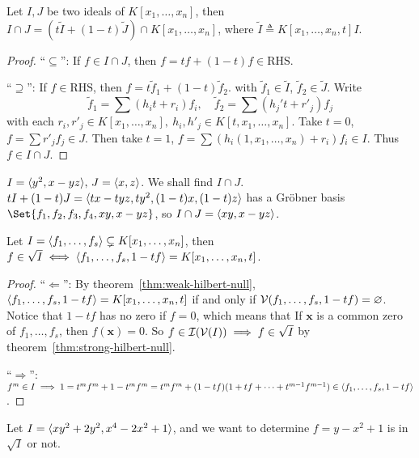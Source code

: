 \begin{theorem}
  Let $I, J$ be two ideals of $K[x_1, \dots, x_n]$, then $I \cap J =
  (t \tilde{I} + (1 - t) \tilde{J}) \cap K[x_1, \dots, x_n]$,
  where $\tilde{I} \triangleq K[x_1, \dots, x_n, t] I$.
  \begin{proof}
    ``$\subseteq$'': If $f \in I \cap J$, then $f = tf + (1-t)f \in \text{RHS}$.

    ``$\supseteq$'': If $f \in \text{RHS}$, then $f = t \tilde{f}_1 + (1-t) \tilde{f}_2$.
    with $\tilde{f}_1 \in \tilde{I}$, $\tilde{f}_2 \in \tilde{J}$.
    Write
    \[ \tilde{f}_1 = \sum (h_i t + r_i) f_i, \quad
      \tilde{f}_2 = \sum (h_j' t + r'_j) f_j \]
    with each $r_i, r'_j \in K[x_1, \dots, x_n], \ h_i, h'_j \in K[t, x_1, \dots, x_n] $.
    Take $t = 0$, $f = \sum r'_j f_j \in J$. Then take $t = 1$,
    $f = \sum (h_i(1, x_1, \dots, x_n) + r_i) f_i \in I$. Thus $f \in I \cap J$.
  \end{proof}
\end{theorem}

\begin{example}
  $I = \langle y^2 , x - yz \rangle, \, J = \langle x, z \rangle$. We shall find $I \cap J$. \\
  $tI + (1-t)J = \langle tx - tyz, ty^2, (1-t)x, (1-t)z \rangle$ has a Gr\"obner basis
  $\Set{f_1, f_2, f_3, f_4, xy, x - yz}$, so $I \cap J = \langle xy, x-yz \rangle$.
\end{example}

\begin{theorem}
  Let $I = \langle f_1, \dots, f_s \rangle \subsetneq K[x_1, \dots, x_n]$, then
  $f \in \sqrt{I} \iff \langle f_1, \dots, f_s, 1 - tf \rangle = K[x_1, \dots, x_n, t]$.
  \begin{proof}
    ``$\Leftarrow$'': By theorem~\ref{thm:weak-hilbert-null},
    $\langle f_1, \dots, f_s, 1-tf\rangle = K[x_1, \dots, x_n, t]$ if and only if
    $\mathcal{V}(f_1, \dots, f_s, 1-tf) = \varnothing$. Notice that $1-tf$
    has no zero if $f = 0$, which means that
    If $\bm{x}$ is a common zero of $f_1, \dots, f_s$, then
    $f(\bm{x}) = 0$. So $f \in \mathcal{I}(\mathcal{V}(I)) \implies f \in \sqrt{I}$
    by theorem~\ref{thm:strong-hilbert-null}.

    ``$\Rightarrow$'': $f^m \in I \implies 1 = t^mf^m + 1 - t^m f^m
    = t^m f^m + (1-tf)(1 + tf + \dots + t^{m-1} f^{m-1}) \in \langle f_1, \dots, f_s, 1-tf\rangle$.
  \end{proof}
\end{theorem}

\begin{example}
  Let $I = \langle xy^2 + 2y^2, x^4 - 2x^2 + 1 \rangle$, and we want to determine
  $f = y - x^2 + 1$ is in $\sqrt{I}$ or not.
\end{example}

